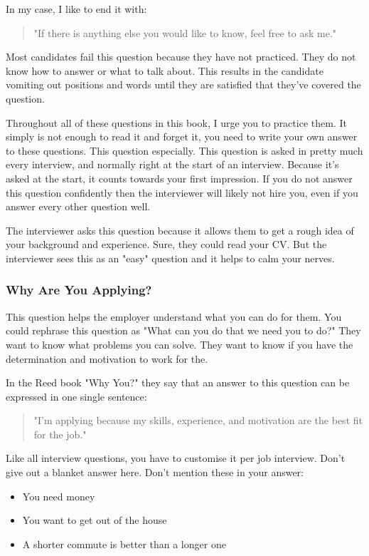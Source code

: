 \documentclass{article}
\begin{document}
In my case, I like to end it with:
\begin{quote}
 "If there is anything else you would like to know, feel free to ask
me."  
\end{quote}


Most candidates fail this question because they have not practiced. They
do not know how to answer or what to talk about. This results in the
candidate vomiting out positions and words until they are satisfied that
they've covered the question.

Throughout all of these questions in this book, I urge you to practice
them. It simply is not enough to read it and forget it, you need to
write your own answer to these questions. This question especially. This
question is asked in pretty much every interview, and normally right at
the start of an interview. Because it's asked at the start, it counts
towards your first impression. If you do not answer this question
confidently then the interviewer will likely not hire you, even if you
answer every other question well.

The interviewer asks this question because it allows them to get a rough
idea of your background and experience. Sure, they could read your CV.
But the interviewer sees this as an "easy" question and it helps to calm
your nerves.
\subsubsection{Why Are You Applying?}
This question helps the employer understand what you can do for them.
You could rephrase this question as "What can you do that we need you to
do?" They want to know what problems you can solve. They want to know if
you have the determination and motivation to work for the.

In the Reed book "Why You?" they say that an answer to this question can
be expressed in one single sentence:
\begin{quote}
"I'm applying because my skills, experience, and motivation are the best
fit for the job."    
\end{quote}


Like all interview questions, you have to customise it per job
interview. Don't give out a blanket answer here. Don't mention these in
your answer:
\begin{itemize}
\item
  You need money
\item
  You want to get out of the house
\item
  A shorter commute is better than a longer one
\end{itemize}
\end{document}
